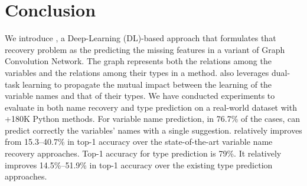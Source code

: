 \section{Conclusion}
\label{sec:conclusion}

We introduce {\tool}, a Deep-Learning (DL)-based approach that
formulates that recovery problem as the predicting the missing
features in a variant of Graph Convolution Network. The graph
represents both the relations among the variables and the relations
among their types in a method. {\tool} also leverages
dual-task learning to propagate the mutual impact between the learning
of the variable names and that of their types. We have conducted
experiments to evaluate {\tool} in both name recovery and type
prediction on a real-world dataset with +180K Python methods. For
variable name prediction, in 76.7\% of the cases, {\tool} can predict
correctly the variables' names with a single suggestion. {\tool}
relatively improves from 15.3--40.7\% in top-1 accuracy over the
state-of-the-art variable name recovery approaches.
Top-1 accuracy for type prediction is 79\%.
It relatively improves 14.5\%--51.9\% in top-1 accuracy over the
existing type prediction approaches.

